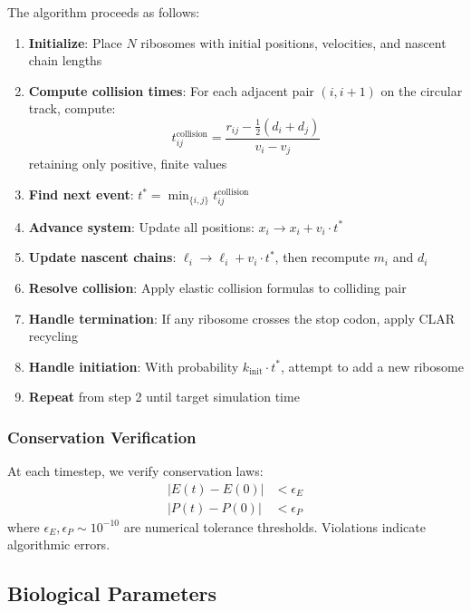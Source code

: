 \documentclass[11pt]{article}
\begin{document}
The algorithm proceeds as follows:
\begin{enumerate}[nosep]
    \item \textbf{Initialize}: Place $N$ ribosomes with initial positions, velocities, and nascent chain lengths
    \item \textbf{Compute collision times}: For each adjacent pair $(i, i+1)$ on the circular track, compute:
    \begin{equation}
        t_{ij}^{\text{collision}} = \frac{r_{ij} - \frac{1}{2}(d_i + d_j)}{v_i - v_j}
    \end{equation}
    retaining only positive, finite values
    \item \textbf{Find next event}: $t^* = \min_{\{i,j\}} t_{ij}^{\text{collision}}$
    \item \textbf{Advance system}: Update all positions: $x_i \to x_i + v_i \cdot t^*$
    \item \textbf{Update nascent chains}: $\ell_i \to \ell_i + v_i \cdot t^*$, then recompute $m_i$ and $d_i$
    \item \textbf{Resolve collision}: Apply elastic collision formulas to colliding pair
    \item \textbf{Handle termination}: If any ribosome crosses the stop codon, apply CLAR recycling
    \item \textbf{Handle initiation}: With probability $k_{\text{init}} \cdot t^*$, attempt to add a new ribosome
    \item \textbf{Repeat} from step 2 until target simulation time
\end{enumerate}

\subsubsection{Conservation Verification}

At each timestep, we verify conservation laws:
\begin{align}
    \left| E(t) - E(0) \right| &< \epsilon_E \\
    \left| P(t) - P(0) \right| &< \epsilon_P
\end{align}
where $\epsilon_E, \epsilon_P \sim 10^{-10}$ are numerical tolerance thresholds. Violations indicate algorithmic errors.

\subsection{Biological Parameters}
\end{document}
